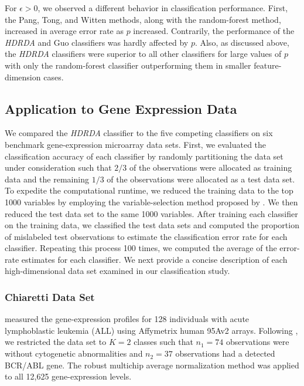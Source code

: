 \documentclass[]{interact}\usepackage[]{graphicx}\usepackage[]{color}
\begin{document}
For $\epsilon > 0$, we observed a different behavior in classification
performance. First, the Pang, Tong, and Witten methods, along with the
random-forest method, increased in average error rate as $p$ increased.
Contrarily, the performance of the \emph{HDRDA} and Guo classifiers was hardly
affected by $p$. Also, as discussed above, the \emph{HDRDA} classifiers were
superior to all other classifiers for large values of $p$ with only the
random-forest classifier outperforming them in smaller feature-dimension cases.

\subsection{Application to Gene Expression Data}

We compared the \emph{HDRDA} classifier to the five competing classifiers on six
benchmark gene-expression microarray data sets. First, we evaluated the
classification accuracy of each classifier by randomly partitioning the data set
under consideration such that $2/3$ of the observations were allocated as
training data and the remaining $1/3$ of the observations were allocated as a
test data set. To expedite the computational runtime, we reduced the training
data to the top 1000 variables by employing the variable-selection method
proposed by \cite{Dudoit:2002ev}. We then reduced the test data set to the same
1000 variables. After training each classifier on the training data, we
classified the test data sets and computed the proportion of mislabeled test
observations to estimate the classification error rate for each classifier.
Repeating this process 100 times, we computed the average of the error-rate
estimates for each classifier. We next provide a concise description of each
high-dimensional data set examined in our classification study.

\subsubsection{Chiaretti Data Set}

\cite{Chiaretti:2004gq} measured the gene-expression profiles for 128
individuals with acute lymphoblastic leukemia (ALL) using Affymetrix human 95Av2
arrays. Following \cite{Xu:2009fl}, we restricted the data set to $K = 2$
classes such that $n_1 = 74$ observations were without cytogenetic abnormalities
and $n_2 = 37$ observations had a detected BCR/ABL gene. The robust multichip
average normalization method was applied to all 12,625 gene-expression levels.
\end{document}
